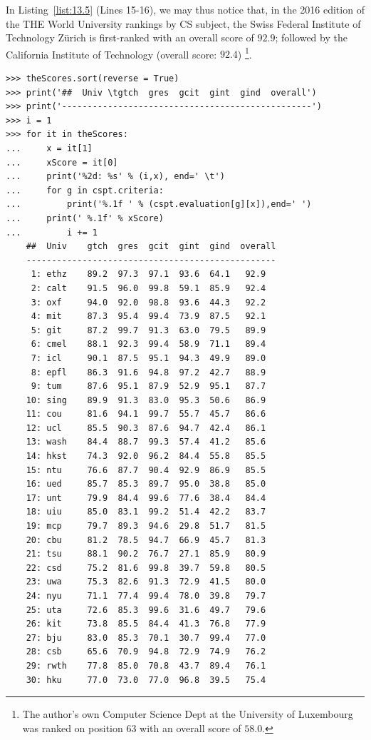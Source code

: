 In Listing~\vref{list:13.5} (Lines 15-16), we may thus notice that, in the 2016 edition of the THE World University rankings by CS subject, the Swiss Federal Institute of Technology Zürich is first-ranked with an overall score of $92.9$; followed by the California Institute of Technology (overall score: $92.4$) \footnote{The author's own Computer Science Dept at the University of Luxembourg was ranked on position 63 with an overall score of $58.0$.}.
\begin{lstlisting}[caption={Printing the ranked performance table},label=list:13.5,basicstyle=\ttfamily\scriptsize]
>>> theScores.sort(reverse = True)
>>> print('##  Univ \tgtch  gres  gcit  gint  gind  overall')
>>> print('-------------------------------------------------') 
>>> i = 1
>>> for it in theScores:
...     x = it[1]
...     xScore = it[0]
...     print('%2d: %s' % (i,x), end=' \t')
...     for g in cspt.criteria:
...         print('%.1f ' % (cspt.evaluation[g][x]),end=' ')
...	    print(' %.1f' % xScore)
...         i += 1   
    ##  Univ 	gtch  gres  gcit  gint  gind  overall
    -------------------------------------------------
     1: ethz 	89.2  97.3  97.1  93.6  64.1   92.9
     2: calt 	91.5  96.0  99.8  59.1  85.9   92.4
     3: oxf 	94.0  92.0  98.8  93.6  44.3   92.2
     4: mit 	87.3  95.4  99.4  73.9  87.5   92.1
     5: git 	87.2  99.7  91.3  63.0  79.5   89.9
     6: cmel 	88.1  92.3  99.4  58.9  71.1   89.4
     7: icl 	90.1  87.5  95.1  94.3  49.9   89.0
     8: epfl 	86.3  91.6  94.8  97.2  42.7   88.9
     9: tum 	87.6  95.1  87.9  52.9  95.1   87.7
    10: sing 	89.9  91.3  83.0  95.3  50.6   86.9
    11: cou 	81.6  94.1  99.7  55.7  45.7   86.6
    12: ucl 	85.5  90.3  87.6  94.7  42.4   86.1
    13: wash 	84.4  88.7  99.3  57.4  41.2   85.6
    14: hkst 	74.3  92.0  96.2  84.4  55.8   85.5
    15: ntu 	76.6  87.7  90.4  92.9  86.9   85.5
    16: ued 	85.7  85.3  89.7  95.0  38.8   85.0
    17: unt 	79.9  84.4  99.6  77.6  38.4   84.4
    18: uiu 	85.0  83.1  99.2  51.4  42.2   83.7
    19: mcp 	79.7  89.3  94.6  29.8  51.7   81.5
    20: cbu 	81.2  78.5  94.7  66.9  45.7   81.3
    21: tsu 	88.1  90.2  76.7  27.1  85.9   80.9
    22: csd 	75.2  81.6  99.8  39.7  59.8   80.5
    23: uwa 	75.3  82.6  91.3  72.9  41.5   80.0
    24: nyu 	71.1  77.4  99.4  78.0  39.8   79.7
    25: uta 	72.6  85.3  99.6  31.6  49.7   79.6
    26: kit 	73.8  85.5  84.4  41.3  76.8   77.9
    27: bju 	83.0  85.3  70.1  30.7  99.4   77.0
    28: csb 	65.6  70.9  94.8  72.9  74.9   76.2
    29: rwth 	77.8  85.0  70.8  43.7  89.4   76.1
    30: hku 	77.0  73.0  77.0  96.8  39.5   75.4

\end{lstlisting}
